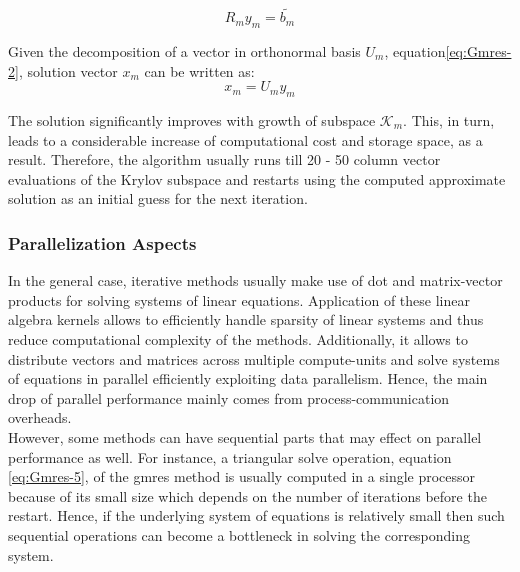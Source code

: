 \begin{equation} \label{eq:Gmres-5}
	R_m y_{m} = \tilde{b_m}
\end{equation}

Given the decomposition of a vector in orthonormal basis $U_{m}$, equation\ref{eq:Gmres-2}, solution vector $x_{m}$ can be written as:\\

\begin{equation} \label{eq:Gmres-6}
	x_m = U_m y_{m}  
\end{equation}


The solution significantly improves with growth of subspace $\mathcal{K}_{m}$. This, in turn, leads to a considerable increase of computational cost and storage space, as a result. Therefore, the algorithm usually runs till 20 - 50 column vector evaluations of the Krylov subspace and restarts using the computed approximate solution as an initial guess for the next iteration.\\


\subsubsection{Parallelization Aspects}
\label{subseq:iterative-parallel-aspects}


In the general case, iterative methods usually make use of dot and matrix-vector products for solving systems of linear equations. Application of these linear algebra kernels allows to efficiently handle sparsity of linear systems and thus reduce computational complexity of the methods. Additionally, it allows to distribute vectors and matrices across multiple compute-units and solve systems of equations in parallel efficiently exploiting data parallelism. Hence, the main drop of parallel performance mainly comes from process-communication overheads.\\


However, some methods can have sequential parts that may effect on parallel performance as well. For instance, a triangular solve operation,  equation \ref{eq:Gmres-5}, of the \gls{gmres} method is usually computed in a single processor because of its small size which depends on the number of iterations before the restart. Hence, if the underlying system of equations is relatively small then such sequential operations can become a bottleneck in solving the corresponding system.\\





